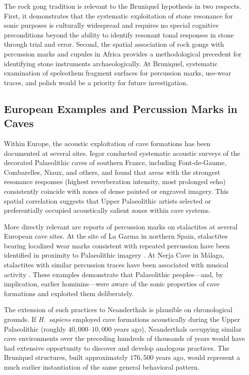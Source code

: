 \documentclass[12pt]{article}
\begin{document}
The rock gong tradition is relevant to the Bruniquel hypothesis in two respects. First, it demonstrates that the systematic exploitation of stone resonance for sonic purposes is culturally widespread and requires no special cognitive preconditions beyond the ability to identify resonant tonal responses in stone through trial and error. Second, the spatial association of rock gongs with percussion marks and cupules in Africa provides a methodological precedent for identifying stone instruments archaeologically. At Bruniquel, systematic examination of speleothem fragment surfaces for percussion marks, use-wear traces, and polish would be a priority for future investigation.

\subsection{European Examples and Percussion Marks in Caves}

Within Europe, the acoustic exploitation of cave formations has been documented at several sites. Iegor \citet{Reznikoff1988} conducted systematic acoustic surveys of the decorated Palaeolithic caves of southern France, including Font-de-Gaume, Combarelles, Niaux, and others, and found that areas with the strongest resonance responses (highest reverberation intensity, most prolonged echo) consistently coincide with zones of dense painted or engraved imagery. This spatial correlation suggests that Upper Palaeolithic artists selected or preferentially occupied acoustically salient zones within cave systems.

More directly relevant are reports of percussion marks on stalactites at several European cave sites. At the site of La Garma in northern Spain, stalactites bearing localized wear marks consistent with repeated percussion have been identified in proximity to Palaeolithic imagery \citep{Bégouën1985}. At Nerja Cave in Málaga, stalactites with similar percussion traces have been associated with musical activity \citep{Lya2014}. These examples demonstrate that Palaeolithic peoples—and, by implication, earlier hominins—were aware of the sonic properties of cave formations and exploited them deliberately.

The extension of such practices to Neanderthals is plausible on chronological grounds. If \textit{H.\ sapiens} employed cave formations acoustically during the Upper Palaeolithic (roughly $40{,}000$--$10{,}000$ years ago), Neanderthals occupying similar cave environments over the preceding hundreds of thousands of years would have had extensive opportunity to discover and develop analogous practices. The Bruniquel structures, built approximately $176{,}500$ years ago, would represent a much earlier instantiation of the same general behavioral pattern.
\end{document}
